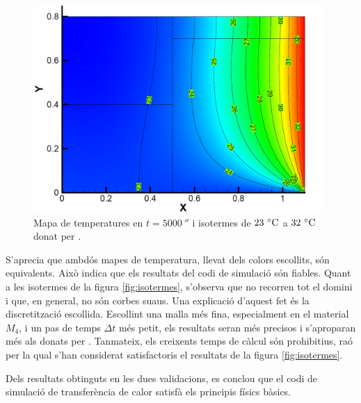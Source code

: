 \begin{figure}[h]
	\centering
	\includegraphics[width=11cm]{imagenes/03_validacio/isotermes_cttc.PNG}
	\caption{Mapa de temperatures en $t = 5000 \ \second$ i isotermes de $23 \ \celsius$ a $32 \ \celsius$ donat per \cite{cttc}.}
	\label{fig:isotermes_cttc}
\end{figure}

S'aprecia que ambdós mapes de temperatura, llevat dels colors escollits, són equivalents. Això indica que els resultats del codi de simulació són fiables. Quant a les isotermes de la figura \ref{fig:isotermes}, s'observa que no recorren tot el domini i que, en general, no són corbes suaus. Una explicació d'aquest fet és la discretització escollida. Escollint una malla més fina, especialment en el material $M_4$, i un pas de temps $\Delta t$ més petit, els resultats seran més precisos i s'aproparan més als donats per \cite{cttc}. Tanmateix, els creixents temps de càlcul són prohibitius, raó per la qual s'han considerat satisfactoris el resultats de la figura \ref{fig:isotermes}.

Dels resultats obtinguts en les dues validacions, es conclou que el codi de simulació de transferència de calor satisfà els principis físics bàsics.



